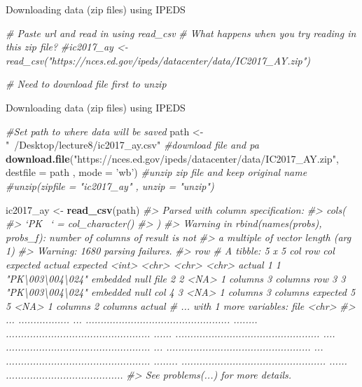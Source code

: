 \documentclass[8pt,ignorenonframetext,dvipsnames]{beamer}
\newenvironment{Shaded}{\begin{snugshade}}{\end{snugshade}}
\newcommand{\KeywordTok}[1]{\textcolor[rgb]{0.13,0.29,0.53}{\textbf{#1}}}
\newcommand{\DataTypeTok}[1]{\textcolor[rgb]{0.13,0.29,0.53}{#1}}
\newcommand{\StringTok}[1]{\textcolor[rgb]{0.31,0.60,0.02}{#1}}
\newcommand{\CommentTok}[1]{\textcolor[rgb]{0.56,0.35,0.01}{\textit{#1}}}
\newcommand{\NormalTok}[1]{#1}
\renewcommand{\textbf}[1]{{\color{darkgray}\bfseries\fontfamily{Montserrat-TOsF}#1}}
\begin{document}
\begin{frame}[fragile]{Downloading data (zip files) using IPEDS}

\begin{Shaded}
\begin{Highlighting}[]
\CommentTok{# Paste url and read in using read_csv}
\CommentTok{# What happens when you try reading in this zip file? }
\CommentTok{#ic2017_ay <- read_csv("https://nces.ed.gov/ipeds/datacenter/data/IC2017_AY.zip")}

\CommentTok{# Need to download file first to unzip}
\end{Highlighting}
\end{Shaded}

\end{frame}

\begin{frame}[fragile]{Downloading data (zip files) using IPEDS}

\begin{Shaded}
\begin{Highlighting}[]
\CommentTok{#Set path to where data will be saved}
\NormalTok{path <-}\StringTok{ "~/Desktop/lecture8/ic2017_ay.csv"}
\CommentTok{#download file and pa}
\KeywordTok{download.file}\NormalTok{(}\StringTok{"https://nces.ed.gov/ipeds/datacenter/data/IC2017_AY.zip"}\NormalTok{, }\DataTypeTok{destfile =}\NormalTok{ path , }\DataTypeTok{mode =} \StringTok{'wb'}\NormalTok{)}
\CommentTok{#unzip zip file and keep original name}
\CommentTok{#unzip(zipfile = "ic2017_ay" , unzip = "unzip")}

\NormalTok{ic2017_ay <-}\StringTok{ }\KeywordTok{read_csv}\NormalTok{(path)}
\CommentTok{#> Parsed with column specification:}
\CommentTok{#> cols(}
\CommentTok{#>   `PK` = col_character()}
\CommentTok{#> )}
\CommentTok{#> Warning in rbind(names(probs), probs_f): number of columns of result is not}
\CommentTok{#> a multiple of vector length (arg 1)}
\CommentTok{#> Warning: 1680 parsing failures.}
\CommentTok{#> row # A tibble: 5 x 5 col     row              col  expected        actual expected   <int>            <chr>     <chr>         <chr> actual 1     1 "PK\textbackslash{}003\textbackslash{}004\textbackslash{}024"           embedded null file 2     2             <NA> 1 columns     3 columns row 3     3 "PK\textbackslash{}003\textbackslash{}004\textbackslash{}024"           embedded null col 4     3             <NA> 1 columns     3 columns expected 5     5             <NA> 1 columns     2 columns actual # ... with 1 more variables: file <chr>}
\CommentTok{#> ... ................. ... ................................................ ........ ................................................ ...... ................................................ .... ................................................ ... ................................................ ... ................................................ ........ ................................................ ...... .......................................}
\CommentTok{#> See problems(...) for more details.}
\end{Highlighting}
\end{Shaded}

\end{frame}
\end{document}
